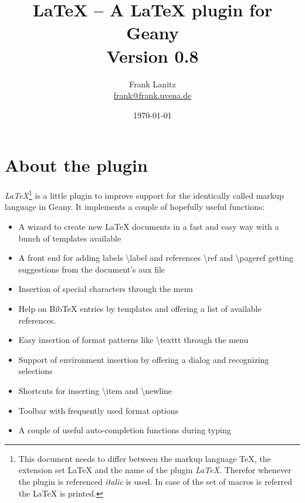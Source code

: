 \documentclass[%
paper=a4,%
fontsize=11pt,%
twoside=false,%
DIV18,%
headsepline,%
plainheadsepline,%
footsepline,%
plainfootsepline,%
bibliography=totoc,%
listof=totoc,%
BCOR10mm,%
parskip=half,%
openany,%
]{scrartcl}
\title{\LaTeX{} -- A \LaTeX{} plugin for Geany \\[1.5ex]
	   \normalsize Version 0.8}
\author{Frank Lanitz \\ \small{\href{mailto:frank@frank.uvena.de}{frank@frank.uvena.de}}}
\date{\today}
\begin{document}
\dedication{\normalsize \textbf{Note:} Please note that this document has been created on
\today. If you are using a devel version from GIT, please compile and check
\texttt{doc/latex.tex} from sources. Please check Page \pageref
{sec:compiling_of_documentation}, Section \ref{sec:compiling_of_documentation} on how to do this. }


\maketitle{}
\tableofcontents{}

\newpage{}

\listoftables{}
\listoffigures{}
\lstlistoflistings{}

\newpage{}

\section{About the plugin}

\textit{LaTeX}\footnote{This document needs to differ between the
markup language \TeX{}, the extension set \LaTeX{} and the name of the
plugin \textit{LaTeX}. Therefor whenever the plugin is referenced
\textit{italic} is used. In case of the set of macros is referred the \LaTeX{} is printed. } is a little plugin to improve support for the
identically called markup language in Geany. It implements a couple of
hopefully useful functions:

\begin{itemize}
	\item A wizard to create new \LaTeX{} documents in a fast and easy way
	 	  with a bunch of templates available
	\item A front end for adding labels \textbackslash label{} and
		  references \textbackslash ref{} and \textbackslash pageref{}
   		  getting suggestions from the document's aux file
	\item Insertion of special characters through the menu
	\item Help on BibTeX entries by templates and offering a list of
		  available references.
	\item Easy insertion of format patterns like \textbackslash texttt{}
		  through the menu
	\item Support of environment insertion by offering a dialog and
		  recognizing selections
	\item Shortcuts for inserting \textbackslash item and
		  \textbackslash newline
	\item Toolbar with frequently used format options
	\item A couple of useful auto-completion functions during typing
\end{itemize}
\end{document}
